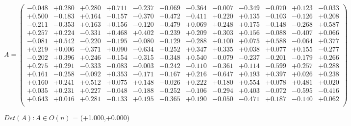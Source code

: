 \documentclass[9pt]{article}
\theoremstyle{plain}
\theoremstyle{definition}
\theoremstyle{remark}
\numberwithin{equation}{section}
\begin{document}
$A = \left(
\begin{array}{
cccccccccccc}
-0.048 & +0.280 & +0.280 & +0.711 & -0.237 & -0.069 & -0.364 & -0.007 & -0.349 & -0.070 & +0.123 & -0.033 \\
+0.500 & -0.183 & +0.164 & -0.157 & -0.370 & +0.472 & -0.411 & +0.220 & +0.135 & -0.103 & -0.126 & +0.208 \\
-0.211 & -0.353 & +0.163 & +0.156 & -0.120 & -0.479 & +0.069 & +0.248 & +0.175 & -0.148 & -0.268 & +0.587 \\
+0.257 & +0.224 & -0.331 & +0.468 & +0.402 & +0.239 & +0.209 & +0.303 & +0.156 & -0.088 & -0.407 & +0.066 \\
-0.081 & +0.542 & -0.220 & -0.195 & -0.080 & -0.129 & -0.288 & +0.100 & +0.075 & +0.588 & -0.064 & +0.377 \\
+0.219 & +0.006 & -0.371 & +0.090 & -0.634 & -0.252 & +0.347 & +0.335 & +0.038 & +0.077 & +0.155 & -0.277 \\
-0.202 & +0.396 & +0.246 & -0.154 & -0.315 & +0.348 & +0.540 & -0.079 & -0.237 & -0.201 & -0.179 & +0.266 \\
+0.275 & +0.291 & -0.333 & -0.083 & -0.003 & -0.242 & -0.110 & -0.361 & +0.114 & -0.599 & +0.257 & +0.288 \\
+0.161 & -0.258 & -0.092 & +0.353 & -0.171 & +0.167 & +0.216 & -0.647 & +0.193 & +0.397 & +0.026 & +0.238 \\
+0.160 & +0.241 & +0.512 & +0.075 & +0.148 & -0.026 & +0.222 & +0.180 & +0.554 & +0.078 & +0.481 & +0.020 \\
+0.035 & +0.231 & +0.227 & -0.048 & -0.188 & -0.252 & -0.106 & -0.294 & +0.403 & -0.072 & -0.595 & -0.416 \\
+0.643 & +0.016 & +0.281 & -0.133 & +0.195 & -0.365 & +0.190 & -0.050 & -0.471 & +0.187 & -0.140 & +0.062 \\
\end{array}
\right)$ \newline 

$Det(A) :   A \in O(n)$ = (+1.000,+0.000)
\end{document}

